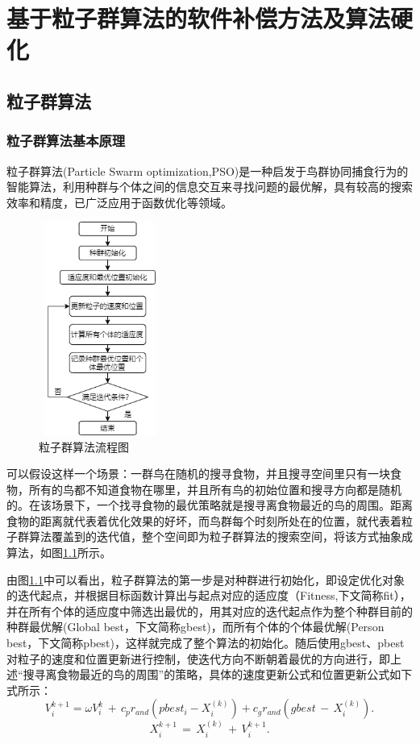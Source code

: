 
\chapter{基于粒子群算法的软件补偿方法及算法硬化}
\section{粒子群算法}
\label{粒子群算法}
\subsection{粒子群算法基本原理}

粒子群算法(Particle Swarm optimization,PSO)是一种启发于鸟群协同捕食行为的智能算法，利用种群与个体之间的信息交互来寻找问题的最优解，具有较高的搜索效率和精度\cite{潘红丽2022基于改进粒子群算法的垃圾清运车辆低碳路径规划}，已广泛应用于函数优化等领域\cite{2022Environmental}。
\begin{figure}[htb]
  \centering
  \includegraphics[width=4cm,height=7cm]{fig/4-fig/粒子群算法流程图.png}
  \caption{粒子群算法流程图}
  \label{fig:粒子群算法流程图}
\end{figure}

可以假设这样一个场景：一群鸟在随机的搜寻食物，并且搜寻空间里只有一块食物，所有的鸟都不知道食物在哪里，并且所有鸟的初始位置和搜寻方向都是随机的。在该场景下，一个找寻食物的最优策略就是搜寻离食物最近的鸟的周围。距离食物的距离就代表着优化效果的好坏，而鸟群每个时刻所处在的位置，就代表着粒子群算法覆盖到的迭代值，整个空间即为粒子群算法的搜索空间，将该方式抽象成算法，如图\ref{fig:粒子群算法流程图}所示。

由图\ref{fig:粒子群算法流程图}中可以看出，粒子群算法的第一步是对种群进行初始化，即设定优化对象的迭代起点，并根据目标函数计算出与起点对应的适应度（Fitness,下文简称fit），并在所有个体的适应度中筛选出最优的，用其对应的迭代起点作为整个种群目前的种群最优解(Global best，下文简称gbest)，而所有个体的个体最优解(Person best，下文简称pbest)，这样就完成了整个算法的初始化。随后使用gbest、pbest对粒子的速度和位置更新进行控制，使迭代方向不断朝着最优的方向进行，即上述“搜寻离食物最近的鸟的周围”的策略，具体的速度更新公式和位置更新公式如下式所示：
\begin{equation}\label{eq:粒子群算法速度更新}
  V^{k+1}_i=\omega V^{k}_i\,+\,c_pr_{and}(pbest_i-X^{(k)}_i)+c_gr_{and}(gbest\,-\,X^{(k)}_i).
\end{equation}
\begin{equation}\label{eq:粒子群算法位置新}
    X^{k+1}_i\,=\,X^{(k)}_i\,+\,V_i^{k+1}.
\end{equation}

